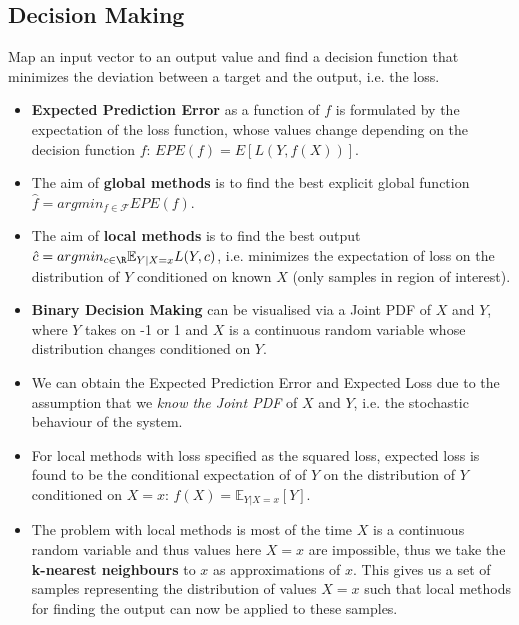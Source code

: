 \documentclass[english]{latex4ei/latex4ei_sheet}
\begin{document}
\begin{sectionbox}
\subsection{Decision Making}
Map an input vector to an output value and find a decision function that minimizes the deviation between a target and the output, i.e. the loss.
\begin{itemize}
    \item \textbf{Expected Prediction Error} as a function of $f$ is formulated by the expectation of the loss function, whose values change depending on the decision function $f$: $EPE(f)=E[L(Y, f(X))]$.
    \item The aim of \textbf{global methods} is to find the best explicit global function $\hat{f}=argmin_{f\in\mathcal{F}} EPE(f)$.
    \item The aim of \textbf{local methods} is to find the best output $\hat{c}=argmin_{c\in\R}\mathbb{E}_{Y|X=x}L(Y,c)$, i.e. minimizes the expectation of loss on the distribution of $Y$ conditioned on known $X$ (only samples in region of interest).
    \item \textbf{Binary Decision Making} can be visualised via a Joint PDF of $X$ and $Y$, where $Y$ takes on -1 or 1 and $X$  is a continuous random variable whose distribution changes conditioned on $Y$.
    \item We can obtain the Expected Prediction Error and Expected Loss due to the assumption that we \emph{know the Joint PDF} of $X$ and $Y$, i.e. the stochastic behaviour of the system.
    \item For local methods with loss specified as the squared loss, expected loss is found to be the conditional expectation of of $Y$ on the distribution of $Y$ conditioned on $X=x$: $f(X)=\mathbb{E}_{Y|X=x}[Y]$.
    \item The problem with local methods is most of the time $X$ is a continuous random variable and thus values here $X=x$ are impossible, thus we take the \textbf{k-nearest neighbours} to $x$ as approximations of $x$. This gives us a set of samples representing the distribution of values $X=x$ such that local methods for finding the output can now be applied to these samples.
\end{itemize}
\end{sectionbox}
\end{document}
